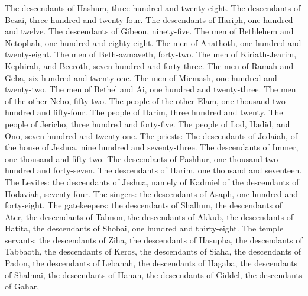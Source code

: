 \begin{biblechapter}
\verse The descendants of Hashum, three hundred and twenty-eight.
\verse The descendants of Bezai, three hundred and twenty-four.
\verse The descendants of Hariph, one hundred and twelve.
\verse The descendants of Gibeon, ninety-five.
\verse The men of Bethlehem and Netophah, one hundred and eighty-eight.
\verse The men of Anathoth, one hundred and twenty-eight.
\verse The men of Beth-azmaveth, forty-two.
\verse The men of Kiriath-Jearim, Kephirah, and Beeroth, seven hundred and forty-three.
\verse The men of Ramah and Geba, six hundred and twenty-one.
\verse The men of Micmash, one hundred and twenty-two.
\verse The men of Bethel and Ai, one hundred and twenty-three.
\verse The men of the other Nebo, fifty-two.
\verse The people of the other Elam, one thousand two hundred and fifty-four.
\verse The people of Harim, three hundred and twenty.
\verse The people of Jericho, three hundred and forty-five.
\verse The people of Lod, Hadid, and Ono, seven hundred and twenty-one.
\verse The priests: The descendants of Jedaiah, of the house of Jeshua, nine hundred and seventy-three.
\verse The descendants of Immer, one thousand and fifty-two.
\verse The descendants of Pashhur, one thousand two hundred and forty-seven.
\verse The descendants of Harim, one thousand and seventeen.
\verse The Levites: the descendants of Jeshua, namely of Kadmiel of the descendants of Hodaviah, seventy-four.
\verse The singers: the descendants of Asaph, one hundred and forty-eight.
\verse The gatekeepers: the descendants of Shallum, the descendants of Ater, the descendants of Talmon, the descendants of Akkub, the descendants of Hatita, the descendants of Shobai, one hundred and thirty-eight.
\verse The temple servants: the descendants of Ziha, the descendants of Hasupha, the descendants of Tabbaoth,
\verse the descendants of Keros, the descendants of Siaha, the descendants of Padon,
\verse the descendants of Lebanah, the descendants of Hagaba, the descendants of Shalmai,
\verse the descendants of Hanan, the descendants of Giddel, the descendants of Gahar,

\end{biblechapter}
